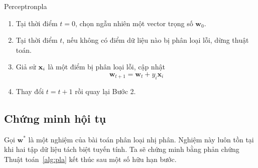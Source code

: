 \begin{myalg}{Perceptron}{pla}
\begin{enumerate}
\item Tại thời điểm $t = 0$, chọn ngẫu nhiên một vector trọng số $\mathbf{w}_0$.

\item Tại thời điểm $t$, nếu không có điểm dữ liệu nào bị phân loại lỗi, dừng thuật toán.

\item Giả sử $\mathbf{x}_i$ là một điểm bị phân loại lỗi, cập nhật
\begin{equation}
\nonumber
\mathbf{w}_{t+1} = \mathbf{w}_t + y_i\mathbf{x}_i
\end{equation}

\item Thay đổi $t = t + 1$ rồi quay lại Bước 2.
\end{enumerate}
\end{myalg}


\subsection{Chứng minh hội tụ}

Gọi $\mathbf{w}^*$ là một nghiệm của bài toán phân loại nhị phân. Nghiệm này luôn tồn tại khi hai tập dữ liệu tách biệt tuyến tính. Ta sẽ chứng minh bằng phản chứng Thuật toán~\ref{alg:pla} kết thúc sau một số hữu hạn bước.

